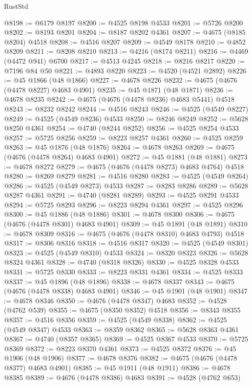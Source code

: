 \begin{lexlean}{RustStd}
\begin{coremodule}
{\begin{coremodule}
{{{{{{{{{{{{{{{{{{{{{{{{{{{{{{{{{{{{{{{{{{{{{{{{{{{{{{{{{{{{@8198 := @6179 @8197
@8200 := @4525 @8198 @4533
@8201 := @5726 @8200
@8202 := @8193 @8201
@8204 := @8187 @8202 @4361
@8207 := @4675 (@8185 @8204) @4518
@8208 := @4516 @8207
@8209 := @4549 @8178
@8210 := @4852 @8209
@8211 := @8208 @8210
@8213 := @4216 (@8174 @8211)
@8216 := @4469 (@4472 @941) @6700
@8217 := @4513 @4245
@8218 := @8216 @8217
@8220 := @7196 @84 @50
@8221 := @4893 @8220
@8223 := @4520 (@4521 @2892)
@8226 := @45 @1866 (@48 @1866)
@8227 := @4678 @8226
@8232 := @4675 (@4676 (@4478 @8227) @4683 @4901)
@8235 := @45 @1871 (@48 @1871)
@8236 := @4678 @8235
@8242 := @4675 (@4676 (@4478 @8236) @4683 @5441) @4518
@8243 := @8232 @8242
@8244 := @4516 @8243
@8246 := @4525 (@4549 @8227)
@8249 := @4525 (@4549 @8236) @4533
@8250 := @8246 @8249
@8252 := @5628 @8250 @4361
@8254 := @4740 (@8244 @8252)
@8256 := @4525 @8254 @4533
@8257 := @5725 @8256
@8259 := @8223 @8257 @4361
@8260 := @4525 @8259
@8263 := @45 @1876 (@48 @1876)
@8264 := @4678 @8263
@8269 := @4675 (@4676 (@4478 @8264) @4683 @4901)
@8272 := @45 @1881 (@48 @1881)
@8273 := @4678 @8272
@8279 := @4675 (@4676 (@4478 @8273) @4683 @4764) @4518
@8280 := @8269 @8279
@8281 := @4516 @8280
@8283 := @4525 (@4549 @8264)
@8286 := @4525 (@4549 @8273) @4533
@8287 := @8283 @8286
@8289 := @5628 @8287 @4361
@8291 := @4740 (@8281 @8289)
@8293 := @4525 @8291 @4533
@8294 := @5725 @8293
@8296 := @8223 @8294 @4361
@8297 := @4525 @8296
@8300 := @45 @1886 (@48 @1886)
@8301 := @4678 @8300
@8306 := @4675 (@4676 (@4478 @8301) @4683 @4901)
@8309 := @45 @1891 (@48 @1891)
@8310 := @4678 @8309
@8316 := @4675 (@4676 (@4478 @8310) @4683 @4793) @4518
@8317 := @8306 @8316
@8318 := @4516 @8317
@8320 := @4525 (@4549 @8301)
@8323 := @4525 (@4549 @8310) @4533
@8324 := @8320 @8323
@8326 := @5628 @8324 @4361
@8328 := @4740 (@8318 @8326)
@8330 := @4525 @8328 @4533
@8331 := @5725 @8330
@8333 := @8223 @8331 @4361
@8334 := @4525 @8333
@8337 := @45 @1896 (@48 @1896)
@8338 := @4678 @8337
@8343 := @4675 (@4676 (@4478 @8338) @4683 @4901)
@8346 := @45 @1901 (@48 @1901)
@8347 := @4678 @8346
@8350 := @4676 (@4478 @8347) @4683
@8352 := @4528 (@4762 @539)
@8355 := @4675 (@8350 @8352) @4518
@8356 := @8343 @8355
@8357 := @4516 @8356
@8359 := @4525 (@4549 @8338)
@8362 := @4525 (@4549 @8347) @4533
@8363 := @8359 @8362
@8365 := @5628 @8363 @4361
@8367 := @4740 (@8357 @8365)
@8369 := @4525 @8367 @4533
@8370 := @5725 @8369
@8372 := @8223 @8370 @4361
@8373 := @4525 @8372
@8376 := @45 @1906 (@48 @1906)
@8377 := @4678 @8376
@8382 := @4675 (@4676 (@4478 @8377) @4683 @4901)
@8385 := @45 @1911 (@48 @1911)
@8386 := @4678 @8385
@8389 := @4676 (@4478 @8386) @4683
@8391 := @4528 (@4762 @653)
}}}}}}}}}}}}}}}}}}}}}}}}}}}}}}}}}}}}}}}}}}}}}}}}}}}}}}}}}}}}
\end{coremodule}}
\end{coremodule}
\end{lexlean}
